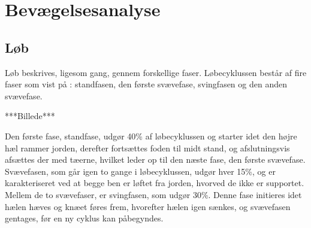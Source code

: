 \section{Bevægelsesanalyse}
%

\subsection{Løb}
%
%
%
%
%

Løb beskrives, ligesom gang, gennem forskellige faser. 
Løbecyklussen består af fire faser som vist på : standfasen, den første svævefase, svingfasen og den anden svævefase. 

***Billede*** \label{fig:loebecyklus} 

Den første fase, standfase, udgør 40\% af løbecyklussen og starter idet den højre hæl rammer jorden, derefter fortsættes foden til midt stand, og afslutningsvis afsættes der med tæerne, hvilket leder op til den næste fase, den første svævefase. Svævefasen, som går igen to gange i løbecyklussen, udgør hver 15\%, og er karakteriseret ved at begge ben er løftet fra jorden, hvorved de ikke er supportet. Mellem de to svævefaser, er svingfasen, som udgør 30\%. Denne fase initieres idet hælen hæves og knæet føres frem, hvorefter hælen igen sænkes, og svævefasen gentages, før en ny cyklus kan påbegyndes. 

